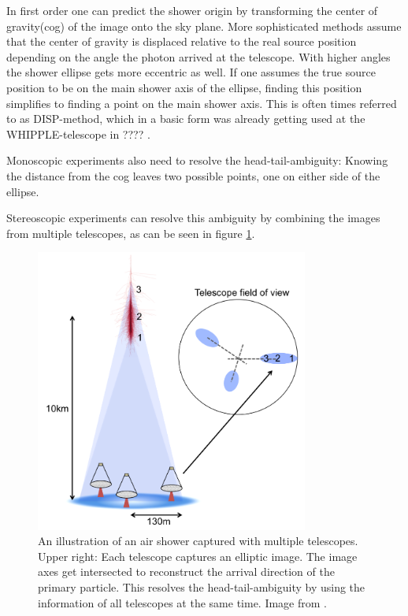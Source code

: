 In first order one can predict the shower origin by 
transforming the center of gravity(cog) of the image onto the sky plane.
More sophisticated methods assume that the 
center of gravity is displaced relative to the
real source position depending on the angle the photon arrived at the telescope.
With higher angles the shower ellipse gets more eccentric as well.
If one assumes the true source position to be on the main shower axis of the ellipse,
finding this position simplifies to finding a point on the main shower axis.
This is often times referred to as DISP-method,
which in a basic form was already getting used at 
the WHIPPLE-telescope in ???? \cite{???}.

Monoscopic experiments also need to resolve the head-tail-ambiguity:
Knowing the distance from the cog leaves two possible points, one on either side 
of the ellipse.

Stereoscopic experiments can resolve this ambiguity by combining the images from 
multiple telescopes, as can be seen in figure \ref{fig:stereo_shower}.

\begin{figure}
	\centering
	\includegraphics[width=0.8\textwidth]{images/stereo_shower.png}
	\caption{An illustration of an air shower captured with multiple telescopes.
		Upper right: Each telescope captures an elliptic image.
		The image axes get intersected to reconstruct the arrival direction
		of the primary particle. This resolves the head-tail-ambiguity
		by using the information of all telescopes at the same time.
	        Image from \cite{holder2015atmospheric}.}
	\label{fig:stereo_shower}
\end{figure}

